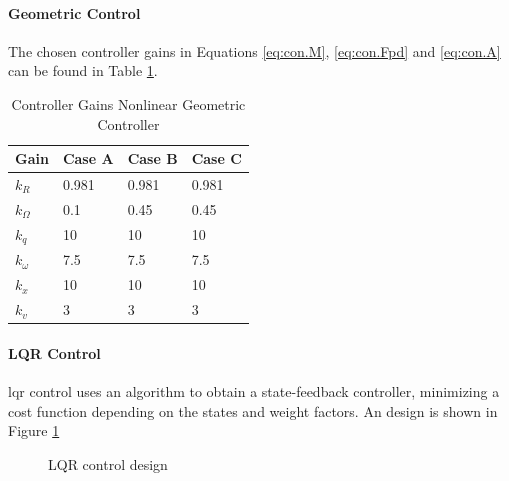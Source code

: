 \paragraph{Geometric Control}
The chosen controller gains in Equations \ref{eq:con.M}, \ref{eq:con.Fpd} and \ref{eq:con.A} can be found in Table \ref{tab:set.gains}.
\begin{table}[h!]
	\centering
	\begin{tabular}{|l|l|l|l|}
		\hline
		\textbf{Gain}&\textbf{Case A}&\textbf{Case B}&\textbf{Case C}\\
		\hline
		$	k_R	$	&	0.981	&	0.981	&	0.981	\\
		$	k_\Omega	$	&	0.1	&	0.45	&	0.45	\\
		$	k_q	$	&	10	&	10	&	10	\\
		$	k_\omega	$	&	7.5	&	7.5	&	7.5	\\
		$	k_x	$	&	10	&	10	&	10	\\
		$	k_v	$	&	3	&	3	&	3	\\
		\hline
	\end{tabular}
	\caption{Controller Gains Nonlinear Geometric Controller}
	\label{tab:set.gains}
\end{table}

\paragraph{LQR Control}
\acf{lqr} control uses an algorithm to obtain a state-feedback controller, minimizing a cost function depending on the states and weight factors. 
An  design is shown in Figure \ref{fig:set.lqr}
\begin{figure}[h!]
	\centering
	\caption{LQR control design\label{fig:set.lqr}}
\end{figure}

